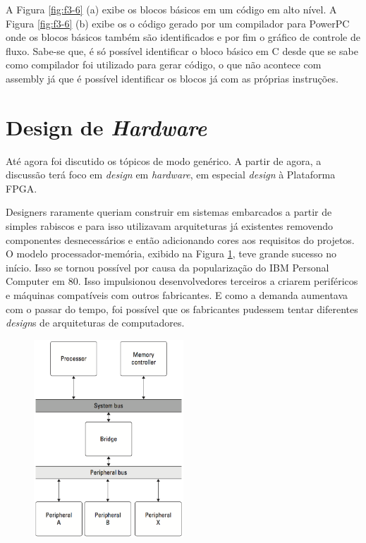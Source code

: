 A Figura \ref{fig:f3-6} (a) exibe os blocos básicos em um código em alto nível. A Figura \ref{fig:f3-6} (b) exibe os o código gerado por um compilador para PowerPC onde os blocos básicos também são identificados e por fim o gráfico de controle de fluxo. Sabe-se que, é só possível identificar o bloco básico em C desde que se sabe como compilador foi  utilizado para gerar código, o que não acontece com assembly já que é possível identificar os blocos já com as próprias instruções.





\section{Design de \textit{Hardware}}



Até agora foi discutido os tópicos de modo genérico. A partir de agora, a discussão terá foco em \textit{design} em \textit{hardware}, em especial \textit{design} à Plataforma FPGA.

Designers raramente queriam construir em sistemas embarcados a partir de simples rabiscos e para isso utilizavam arquiteturas já existentes removendo componentes desnecessários e então adicionando cores aos requisitos do projetos. O modelo processador-memória, exibido na Figura \ref{fig:f3-8}, teve grande sucesso no início. Isso se tornou possível por causa da popularização do IBM Personal Computer em 80. Isso impulsionou desenvolvedores terceiros a criarem periféricos e máquinas compatíveis com outros fabricantes. E como a demanda aumentava com o passar do tempo, foi possível que os fabricantes pudessem tentar diferentes \textit{design}s de arquiteturas de computadores.



\begin{figure}[H] \centering

	\includegraphics[width=0.5\textwidth]{img/f3-8.png}

	\caption{}

	\label{fig:f3-8}

\end{figure}



